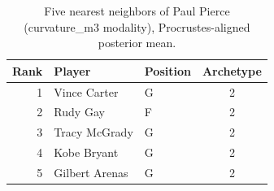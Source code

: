 \begin{table}[htbp]
  \centering\small
  \begin{tabular}{rllc}
    \toprule
    Rank & Player & Position & Archetype \\
    \midrule
    1 & Vince Carter & G & 2 \\
    2 & Rudy Gay & F & 2 \\
    3 & Tracy McGrady & G & 2 \\
    4 & Kobe Bryant & G & 2 \\
    5 & Gilbert Arenas & G & 2 \\
    \bottomrule
  \end{tabular}
  \caption{Five nearest neighbors of Paul Pierce (curvature_m3 modality), Procrustes-aligned posterior mean.}
  \label{tab:Paul_Pierce_neighbors_curvature_m3}
\end{table}

